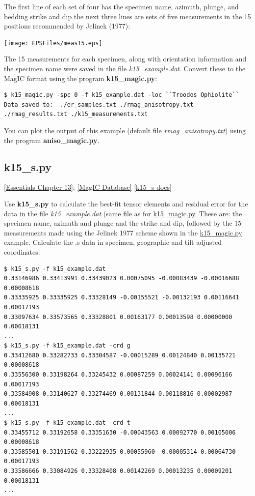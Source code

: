 \documentclass[11pt]{book}
\begin{document}
{{{{  The first line of each set of four has the specimen name, azimuth, plunge, and bedding strike and dip
  the next three lines are sets of five measurements in the 15 positions
 recommended by Jelinek (1977):  \nocite{jelinek77}

  \texttt{[image: EPSFiles/meas15.eps]}


  The 15 measurements for each specimen, along with orientation information and the specimen name were saved in the file {\it k15\_example.dat}.    Convert these to the MagIC format using the program {\bf k15\_magic.py}:

\begin{verbatim}
$ k15_magic.py -spc 0 -f k15_example.dat -loc ``Troodos Ophiolite``
Data saved to:  ./er_samples.txt ./rmag_anisotropy.txt ./rmag_results.txt ./k15_measurements.txt
 \end{verbatim}

You can plot the output of this example (default file {\it rmag\_anisotropy.txt}) using the program {\bf aniso\_magic.py}.

\subsection{k15\_s.py}
\href{http://earthref.org/MAGIC/books/Tauxe/Essentials/WebBook3ch13.html#ch13}{[Essentials Chapter 13]};
\href{#MagICDatabase}{[MagIC Database]}
\href{https://github.com/PmagPy/PmagPy/blob/master/programs/k15_s.py}{[k15\_s docs]}

%
Use {\bf k15\_s.py} to calculate the best-fit tensor elements and residual error for the data in the file {\it k15\_example.dat} (same file as for \href{#k15_magic.py}{k15\_magic.py}.  These are: the specimen name, azimuth and plunge and the strike and dip, followed by the 15 measurements made using the Jelinek 1977 \nocite{jelinek77} scheme shown in the \href{#k15_magic.py}{k15\_magic.py} example.  Calculate the .s data in specimen, geographic  and tilt adjusted coordinates:

\begin{verbatim}
$ k15_s.py -f k15_example.dat
0.33146986 0.33413991 0.33439023 0.00075095 -0.00083439 -0.00016688 0.00008618
0.33335925 0.33335925 0.33328149 -0.00155521 -0.00132193 0.00116641 0.00017193
0.33097634 0.33573565 0.33328801 0.00163177 0.00013598 0.00000000 0.00018131
...
$ k15_s.py -f k15_example.dat -crd g
0.33412680 0.33282733 0.33304587 -0.00015289 0.00124840 0.00135721 0.00008618
0.33556300 0.33198264 0.33245432 0.00087259 0.00024141 0.00096166 0.00017193
0.33584908 0.33140627 0.33274469 0.00131844 0.00118816 0.00002987 0.00018131
...
$ k15_s.py -f k15_example.dat -crd t
0.33455712 0.33192658 0.33351630 -0.00043563 0.00092770 0.00105006 0.00008618
0.33585501 0.33191562 0.33222935 0.00055960 -0.00005314 0.00064730 0.00017193
0.33586666 0.33084926 0.33328408 0.00142269 0.00013235 0.00009201 0.00018131
...
\end{verbatim}

}}}}
\end{document}
